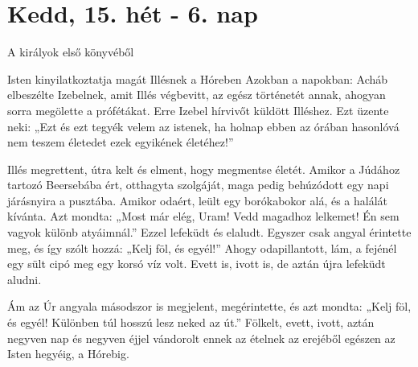 \documentclass[twoside]{article}
\begin{document}


\section*{Kedd, 15. hét - 6. nap}

A királyok első könyvéből

\begin{lectio}{Isten kinyilatkoztatja magát Illésnek a Hóreben}
\noindent Azokban a napokban: Acháb elbeszélte Izebelnek, amit Illés végbevitt, az egész történetét annak, ahogyan sorra megölette a prófétákat. Erre Izebel hírvivőt küldött Illéshez. Ezt üzente neki: „Ezt és ezt tegyék velem az istenek, ha holnap ebben az órában hasonlóvá nem teszem életedet ezek egyikének életéhez!”

Illés megrettent, útra kelt és elment, hogy megmentse életét. Amikor a Júdához tartozó Beersebába ért, otthagyta szolgáját, maga pedig behúzódott egy napi járásnyira a pusztába. Amikor odaért, leült egy borókabokor alá, és a halálát kívánta. Azt mondta: „Most már elég, Uram! Vedd magadhoz lelkemet! Én sem vagyok különb atyáimnál.” Ezzel lefeküdt és elaludt. Egyszer csak angyal érintette meg, és így szólt hozzá: „Kelj föl, és egyél!” Ahogy odapillantott, lám, a fejénél egy sült cipó meg egy korsó víz volt. Evett is, ivott is, de aztán újra lefeküdt aludni.

Ám az Úr angyala másodszor is megjelent, megérintette, és azt mondta: „Kelj föl, és egyél! Különben túl hosszú lesz neked az út.” Fölkelt, evett, ivott, aztán negyven nap és negyven éjjel vándorolt ennek az ételnek az erejéből egészen az Isten hegyéig, a Hórebig.


\end{lectio}
\end{document}
